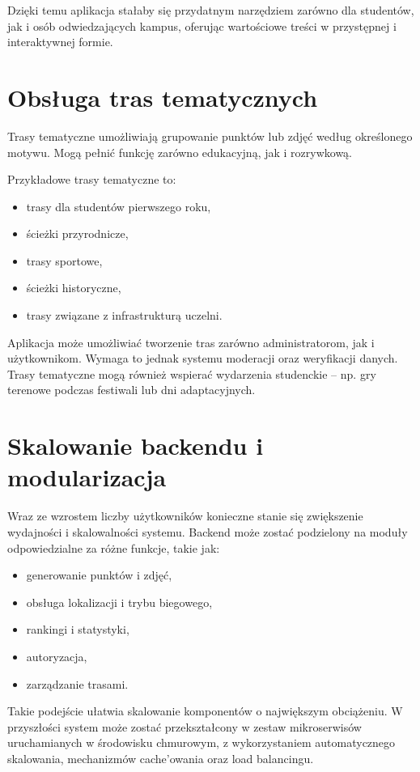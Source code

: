 Dzięki temu aplikacja stałaby się przydatnym narzędziem zarówno dla studentów, jak i osób odwiedzających kampus, oferując wartościowe treści w przystępnej i interaktywnej formie.

\section{Obsługa tras tematycznych}

Trasy tematyczne umożliwiają grupowanie punktów lub zdjęć według określonego motywu. Mogą pełnić funkcję zarówno edukacyjną, jak i rozrywkową.

Przykładowe trasy tematyczne to:
\begin{itemize}
    \item trasy dla studentów pierwszego roku,
    \item ścieżki przyrodnicze,
    \item trasy sportowe,
    \item ścieżki historyczne,
    \item trasy związane z infrastrukturą uczelni.
\end{itemize}

Aplikacja może umożliwiać tworzenie tras zarówno administratorom, jak i użytkownikom. Wymaga to jednak systemu moderacji oraz weryfikacji danych. Trasy tematyczne mogą również wspierać wydarzenia studenckie -- np. gry terenowe podczas festiwali lub dni adaptacyjnych.

\section{Skalowanie backendu i modularizacja}

Wraz ze wzrostem liczby użytkowników konieczne stanie się zwiększenie wydajności i skalowalności systemu. Backend może zostać podzielony na moduły odpowiedzialne za różne funkcje, takie jak:
\begin{itemize}
    \item generowanie punktów i zdjęć,
    \item obsługa lokalizacji i trybu biegowego,
    \item rankingi i statystyki,
    \item autoryzacja,
    \item zarządzanie trasami.
\end{itemize}

Takie podejście ułatwia skalowanie komponentów o największym obciążeniu. W przyszłości system może zostać przekształcony w zestaw mikroserwisów uruchamianych w środowisku chmurowym, z wykorzystaniem automatycznego skalowania, mechanizmów cache'owania oraz load balancingu.

